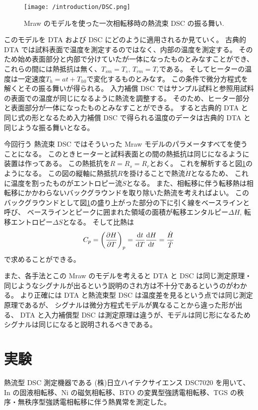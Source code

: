 \documentclass[9pt,dvipdfmx,a4paper]{jsarticle}
\begin{document}
\begin{figure}
    \centering
    \texttt{[image: /introduction/DSC.png]}
    \caption{Mraw のモデルを使った一次相転移時の熱流束 DSC の振る舞い\cite{saito1987}.}
    \label{graph:theory}
\end{figure}
このモデルを DTA および DSC にどのように適用されるか見ていく。
古典的 DTA では試料表面で温度を測定するのではなく、内部の温度を測定する。
そのため始め表面部分と内部で分けていたが一体になったものとみなすことができ、
これらの間には熱抵抗は無く、\(T_{sm}=T_s,\,T_{rm}=T_r\)である。
そしてヒーターの温度は一定速度\(T_h=at+T_{h0}\)で変化するものとみなす。
この条件で微分方程式を解くとその振る舞いが得られる。
入力補償 DSC ではサンプル試料と参照用試料の表面での温度が同じになるように熱流を調整する。
そのため、ヒーター部分と表面部分が一体になったものとみなすことができる。
すると古典的 DTA と同じ式の形となるため入力補償 DSC で得られる温度のデータは古典的 DTA と同じような振る舞いとなる。

今回行う 熱流束 DSC ではそういった Mraw モデルのパラメータすべてを使うことになる。
このときヒーターと試料表面との間の熱抵抗は同じになるように装置は作ってある。
この熱抵抗を\(R=R_s=R_r\)とおく。
これを解析すると図\ref{graph:theory}のようになる\cite{saito1987}。
この図の縦軸に熱抵抗\(R\)を掛けることで熱流\(\dot{H}\)となるため、
これに温度を割ったものがエントロピー流\(\dot{S}\)となる。
また、相転移に伴う転移熱は相転移にかかわらないバックグラウンドを取り除いた熱流を考えればよい。
このバックグラウンドとして図\ref{graph:theory}の盛り上がった部分の下に引く線をベースラインと呼び、
ベースラインとピークに囲まれた領域の面積が転移エンタルピー\(\Delta H\), 転移エントロピー\(\Delta S\)となる。
そして比熱は
\begin{align}
    C_p = \qty(\pdv{H}{T})_p = \dv{t}{T}\dv{H}{t} = \frac{\dot{H}}{\dot{T}}
\end{align}
で求めることができる。

また、各手法とこの Mraw のモデルを考えると DTA と DSC は同じ測定原理・同じようなシグナルが出るという説明のされ方は不十分であるというのがわかる。
より正確には DTA と熱流束型 DSC は温度差を見るという点では同じ測定原理であるが、
シグナルは微分方程式モデルが異なることから違った形が出る、
DTA と入力補償型 DSC は測定原理は違うが、モデルは同じ形になるためシグナルは同じになると説明されるべきである。
\clearpage
\section{実験}
熱流型 DSC 測定機器である (株)日立ハイテクサイエンス DSC7020 を用いて、
In の固液相転移、Ni の磁気相転移、BTO の変異型強誘電相転移、TGS の秩序・無秩序型強誘電相転移に伴う熱異常を測定した。
\end{document}
